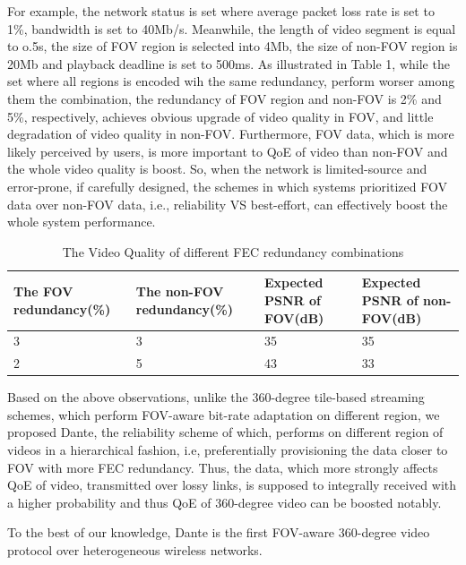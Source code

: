     For example, the network status is set where average packet loss rate is set to 1\%, bandwidth is set to 40Mb/s. Meanwhile, the length of video segment is equal to o.5s, the size of FOV region is selected into 4Mb, the size of non-FOV region is 20Mb and playback deadline is set to 500ms. As illustrated in Table 1, while the set where all regions is encoded wih the same redundancy, perform worser among them the combination, the redundancy of FOV region and non-FOV is 2\% and 5\%, respectively, achieves obvious upgrade of video quality in FOV, and little degradation of video quality in non-FOV. Furthermore, FOV data, which is more likely perceived by users, is more important to QoE of video than non-FOV and the whole video quality is boost. So, when the network is limited-source and error-prone, if carefully designed, the schemes in which systems prioritized FOV data over non-FOV data, i.e., reliability VS best-effort, can effectively boost the whole system performance.       
	
	\begin{table}
		\centering 
		\scriptsize
		\begin{tabular}{p{2.0cm}p{2.0cm}p{1.6cm}p{1.6cm}}
			\rowcolor[gray]{0.9} 
			\hline
			The FOV redundancy(\%) &The non-FOV redundancy(\%) & Expected PSNR of FOV(dB) & Expected PSNR of non-FOV(dB)\\
			\hline
			3  &  3  &  35  &  35\\    
			\hline
			2  &  5  &  43  &  33\\ 
			\hline
			
		\end{tabular}
		\caption{The Video Quality of different FEC redundancy combinations}
		\label{}
	\end{table}
	 
	 
	Based on the above observations, unlike the 360-degree tile-based streaming schemes, which perform FOV-aware bit-rate adaptation on different region, we proposed Dante, the reliability scheme of which, performs on different region of videos in a hierarchical fashion, i.e, preferentially provisioning the data closer to FOV with more FEC redundancy. Thus, the data, which more strongly affects QoE of video, transmitted over lossy links, is supposed to integrally received with a higher probability and thus QoE of 360-degree video can be boosted notably.
 
To the best of our knowledge, Dante is the first FOV-aware 360-degree video protocol over heterogeneous wireless networks.

